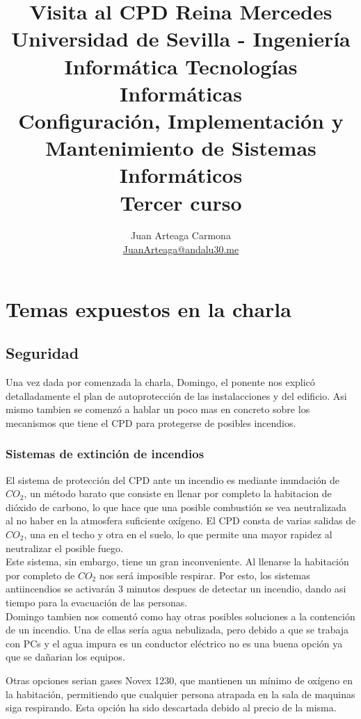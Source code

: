 \documentclass[a4paper,11pt]{article}
\title{
        \textbf{Visita al CPD Reina Mercedes}\large\\
        \medskip
        Universidad de Sevilla - Ingeniería Informática Tecnologías Informáticas\\
        Configuración, Implementación y Mantenimiento de Sistemas Informáticos\\
        Tercer curso}
\author{
Juan Arteaga Carmona\\
\href{mailto:JuanArteaga@andalu30.me}{JuanArteaga@andalu30.me}
}
\begin{document}
\maketitle %
\newpage %
\tableofcontents
\newpage


\section{Temas expuestos en la charla}
\subsection{Seguridad}
Una vez dada por comenzada la charla, Domingo, el ponente nos explicó detalladamente el plan de autoprotección de las instalacciones y del edificio. Asi mismo tambien se comenzó a hablar un poco mas en concreto sobre los mecanismos que tiene el CPD para protegerse de posibles incendios.
\subsubsection{Sistemas de extinción de incendios}
El sistema de protección del CPD ante un incendio es mediante inundación de $CO_2$, un método barato que consiste en llenar por completo la habitacion de dióxido de carbono, lo que hace que una posible combustión se vea neutralizada al no haber en la atmosfera suficiente oxígeno. El CPD consta de varias salidas de $CO_2$, una en el techo y otra en el suelo, lo que permite una mayor rapidez al neutralizar el posible fuego.\\
Este sistema, sin embargo, tiene un gran inconveniente. Al llenarse la habitación por completo de $CO_2$ nos será imposible respirar. Por esto, los sistemas antiincendios se activarán 3 minutos despues de detectar un incendio, dando asi tiempo para la evacuación de las personas.\\

Domingo tambien nos comentó como hay otras posibles soluciones a la contención de un incendio. Una de ellas sería agua nebulizada, pero debido a que se trabaja con PCs y el agua impura es un conductor eléctrico no es una buena opción ya que se dañarian los equipos.

Otras opciones serian gases Novex 1230, que mantienen un mínimo de oxígeno en la habitación, permitiendo que cualquier persona atrapada en la sala de maquinas siga respirando. Esta opción ha sido descartada debido al precio de la misma.\\
\end{document}
